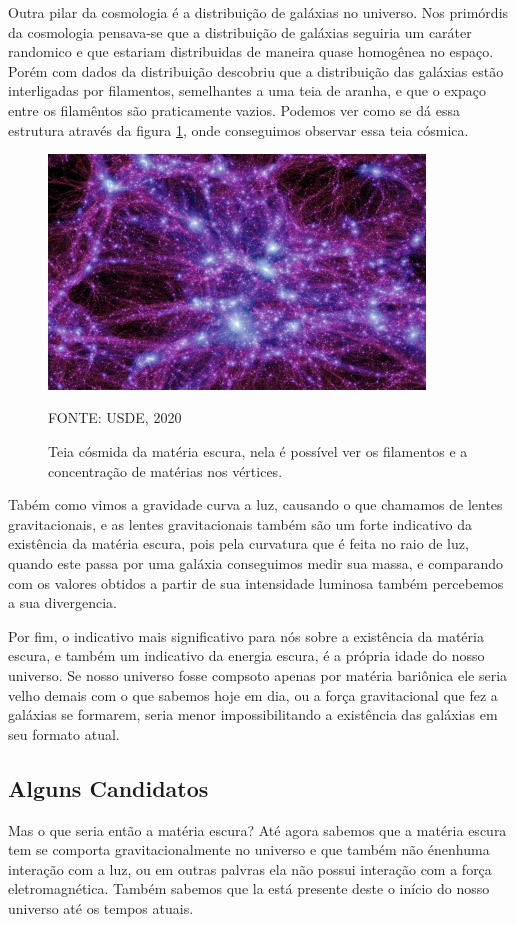 \documentclass[
	article,			%
	11pt,				%
	twoside,			%
	a4paper,			%
	english,			%
	brazil,				%
	sumario=tradicional
	]{abntex2}
\begin{document}
Outra pilar da cosmologia é a distribuição de galáxias no universo. Nos primórdis da cosmologia pensava-se que a distribuição de galáxias seguiria um caráter randomico e que estariam distribuidas de maneira quase homogênea no espaço.
Porém com dados da distribuição descobriu que a distribuição das galáxias estão interligadas por filamentos, semelhantes a uma teia de aranha, e que o expaço entre os filamêntos são praticamente vazios. Podemos ver como se dá essa estrutura através da figura \ref{fig2}, onde conseguimos observar essa teia cósmica.

\begin{figure}\centering
	\caption{Teia cósmida da matéria escura, nela é possível ver os filamentos e a concentração de matérias nos vértices.}
	\includegraphics[width=10cm]{dark_net.png}\label{fig2}
	{\par FONTE: USDE, 2020}
\end{figure}

Tabém como vimos a gravidade curva a luz, causando o que chamamos de lentes gravitacionais, e as lentes gravitacionais também são um forte indicativo da existência da matéria escura, pois pela curvatura que é feita no raio de luz, quando este passa por uma galáxia conseguimos medir sua massa, e comparando com os valores obtidos a partir de sua intensidade luminosa também percebemos a sua divergencia.

Por fim, o indicativo mais significativo para nós sobre a existência da matéria escura, e também um indicativo da energia escura, é a própria idade do nosso universo. Se nosso universo fosse compsoto apenas por matéria bariônica ele seria velho demais com o que sabemos hoje em dia, ou a força gravitacional que fez a galáxias se formarem, seria menor impossibilitando a existência das galáxias em seu formato atual. 

\subsection{Alguns Candidatos}
Mas o que seria então a matéria escura? Até agora sabemos que a matéria escura tem se comporta gravitacionalmente no universo e que também não énenhuma interação com a luz, ou em outras palvras ela não possui interação com a força eletromagnética. Também sabemos que la está presente deste o início do nosso universo até os tempos atuais. 
\end{document}
